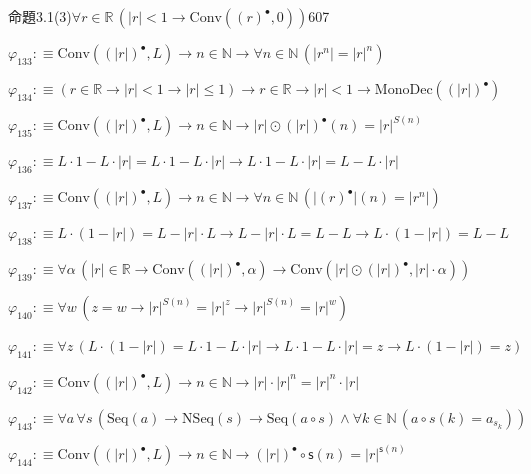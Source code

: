\begin{fullproof}{命題3.1(3)}{$\forall r \in \mathbb{R}\,(\lvert r \rvert < 1 \to \mathrm{Conv}({(r)^{\bullet}},0))$}{607}
\begin{abbrevlist}
\item $\varphi_{133} :\equiv \mathrm{Conv}({(\lvert r \rvert)^{\bullet}},L) \to n \in \mathbb{N} \to \forall n \in \mathbb{N}\,(\lvert {{r}^{n}} \rvert = {{\lvert r \rvert}^{n}})$
\item $\varphi_{134} :\equiv (r \in \mathbb{R} \to \lvert r \rvert < 1 \to \lvert r \rvert \leq 1) \to r \in \mathbb{R} \to \lvert r \rvert < 1 \to \mathrm{MonoDec}({(\lvert r \rvert)^{\bullet}})$
\item $\varphi_{135} :\equiv \mathrm{Conv}({(\lvert r \rvert)^{\bullet}},L) \to n \in \mathbb{N} \to \lvert r \rvert \odot {(\lvert r \rvert)^{\bullet}}(n) = {{\lvert r \rvert}^{S(n)}}$
\item $\varphi_{136} :\equiv L \cdot 1 - L \cdot \lvert r \rvert = L \cdot 1 - L \cdot \lvert r \rvert \to L \cdot 1 - L \cdot \lvert r \rvert = L - L \cdot \lvert r \rvert$
\item $\varphi_{137} :\equiv \mathrm{Conv}({(\lvert r \rvert)^{\bullet}},L) \to n \in \mathbb{N} \to \forall n \in \mathbb{N}\,(\lvert {(r)^{\bullet}} \rvert(n) = \lvert {{r}^{n}} \rvert)$
\item $\varphi_{138} :\equiv L \cdot (1 - \lvert r \rvert) = L - \lvert r \rvert \cdot L \to L - \lvert r \rvert \cdot L = L - L \to L \cdot (1 - \lvert r \rvert) = L - L$
\item $\varphi_{139} :\equiv \forall \alpha\,(\lvert r \rvert \in \mathbb{R} \to \mathrm{Conv}({(\lvert r \rvert)^{\bullet}},\alpha) \to \mathrm{Conv}(\lvert r \rvert \odot {(\lvert r \rvert)^{\bullet}},\lvert r \rvert \cdot \alpha))$
\item $\varphi_{140} :\equiv \forall w\,(z = w \to {{\lvert r \rvert}^{S(n)}} = {{\lvert r \rvert}^{z}} \to {{\lvert r \rvert}^{S(n)}} = {{\lvert r \rvert}^{w}})$
\item $\varphi_{141} :\equiv \forall z\,(L \cdot (1 - \lvert r \rvert) = L \cdot 1 - L \cdot \lvert r \rvert \to L \cdot 1 - L \cdot \lvert r \rvert = z \to L \cdot (1 - \lvert r \rvert) = z)$
\item $\varphi_{142} :\equiv \mathrm{Conv}({(\lvert r \rvert)^{\bullet}},L) \to n \in \mathbb{N} \to \lvert r \rvert \cdot {{\lvert r \rvert}^{n}} = {{\lvert r \rvert}^{n}} \cdot \lvert r \rvert$
\item $\varphi_{143} :\equiv \forall a\,\forall s\,(\mathrm{Seq}(a) \to \mathrm{NSeq}(s) \to \mathrm{Seq}(a \circ s) \land \forall k \in \mathbb{N}\,(a \circ s(k) = a_{s_{k}}))$
\item $\varphi_{144} :\equiv \mathrm{Conv}({(\lvert r \rvert)^{\bullet}},L) \to n \in \mathbb{N} \to {(\lvert r \rvert)^{\bullet}} \circ \mathsf{s}(n) = {{\lvert r \rvert}^{\mathsf{s}(n)}}$

\end{abbrevlist}
\end{fullproof}
